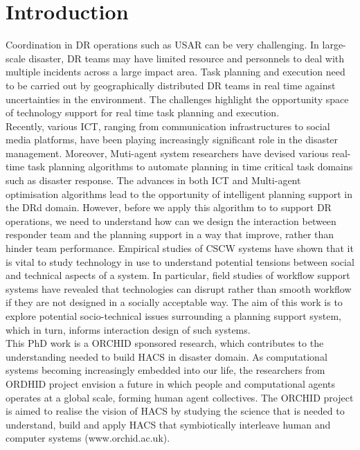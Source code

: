 \chapter{Introduction}\label{ch:introduction}
Coordination in \acf{DR} operations such as \acf{USAR} can be very challenging. In large-scale disaster, DR teams may have limited resource and personnels to deal with multiple incidents across a large impact area. Task planning and execution need to be carried out by geographically distributed DR teams in real time against uncertainties in the environment. The challenges highlight the opportunity space of technology support for real time task planning and execution.  \\ 

Recently, various \acf{ICT}, ranging from communication infrastructures to social media platforms, have been playing increasingly significant role in the disaster management.  Moreover, Muti-agent system researchers have devised various real-time task planning algorithms to automate planning in time critical task domains such as disaster response. The advances in both \ac{ICT} and Multi-agent optimisation algorithms lead to the opportunity of intelligent planning support in the \ac{DR}d domain. However, before we apply this algorithm to to support \ac{DR} operations, we need to understand how can we design the interaction between responder team and the planning support in a way that improve, rather than hinder team performance. Empirical studies of \acf{CSCW} systems have shown that it is vital to study technology in use to understand potential tensions between social and technical aspects of a system. In particular, field studies of workflow support systems have revealed that technologies can disrupt rather than smooth workflow if they are not designed in a socially acceptable way. The aim of this work is to explore potential socio-technical issues surrounding a planning support system, which in turn, informs interaction design of such systems. \\

This PhD work is a ORCHID sponsored research, which contributes to the understanding needed to build \acf{HACS} in disaster domain. As computational systems  becoming increasingly embedded into our life, the researchers from ORDHID project envision a future in which people and computational agents operates at a global scale, forming human agent collectives. The ORCHID project is aimed to realise the vision of \ac{HACS} by studying the science that is needed to understand, build and apply \ac{HACS} that symbiotically interleave human and computer systems (www.orchid.ac.uk).\\

